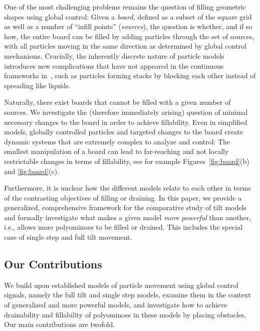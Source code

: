 \documentclass[a4paper,UKenglish,cleveref,thm-restate]{lipics-v2021}
\begin{document}
One of the most challenging problems remains the question of filling geometric shapes using global control:
Given a \emph{board}, defined as a subset of the square grid as well as a number of ``infill points'' (\emph{sources}), the question is whether, and if so how, the entire board can be filled by adding particles through the set of sources, with all particles moving in the same direction as determined by global control mechanisms.
Crucially, the inherently discrete nature of particle models introduces new complications that have not appeared in the continuous frameworks in~\cite{BoseT95,BoseKT98}, such as particles forming stacks by blocking each other instead of spreading like liquids.

Naturally, there exist boards that cannot be filled with a given number of sources.
We investigate the (therefore immediately arising) question of minimal necessary changes to the board in order to achieve fillability.
Even in simplified models, globally controlled particles and targeted changes to the board create dynamic systems that are extremely complex to analyze and control:
The smallest manipulation of a board can lead to far-reaching and not locally restrictable changes in terms of fillability, see for example Figures~\ref{fig:board}(b) and \ref{fig:board}(c).

Furthermore, it is unclear how the different models relate to each other in terms of the contrasting objectives of filling or draining.
In this paper, we provide a generalized, comprehensive framework for the comparative study of tilt models and
formally investigate what makes a given model \emph{more powerful} than another, i.e., allows more polyominoes to be filled or drained.
This includes the special case of single step and full tilt movement.

\subsection{Our Contributions}
\label{subsec:contribution}

We build upon established models of particle movement using global control
signals, namely the full tilt and single step models, examine them in the
context of generalized and more powerful models, and investigate how to achieve
drainability and fillability of polyominoes in these models by placing
obstacles. Our main contributions are twofold.
\end{document}
